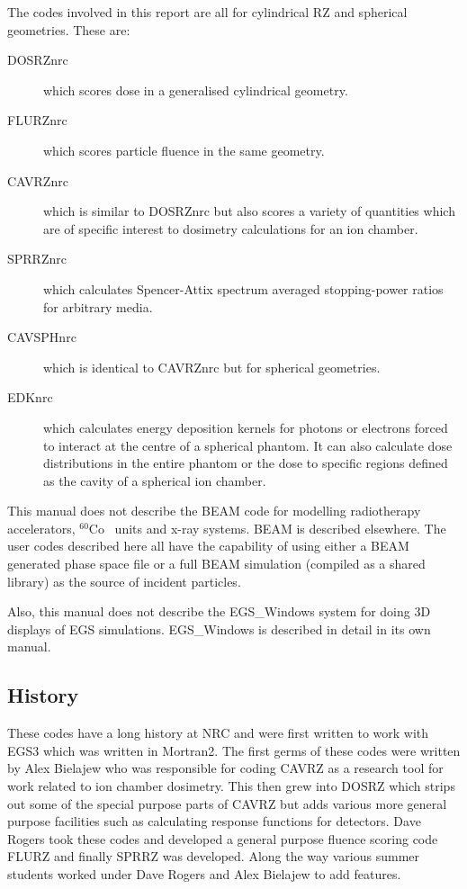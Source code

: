\documentclass[12pt,twoside]{article}  %
\newcommand{\Co}{$^{60}$Co}
\begin{document}
The codes involved in this report are all for
cylindrical RZ and spherical geometries. These are:
\begin{description}

\item[DOSRZnrc] which scores dose in a generalised cylindrical geometry.

\item[FLURZnrc] which scores particle fluence in the same geometry.

\item[CAVRZnrc] which is similar to DOSRZnrc but also scores a variety of
quantities which are of specific interest to dosimetry
calculations for an ion chamber.

\item[SPRRZnrc] which calculates Spencer-Attix spectrum averaged
stopping-power ratios for arbitrary media.

\item[CAVSPHnrc] which is identical to CAVRZnrc but for spherical
geometries.

\item[EDKnrc] which calculates energy deposition kernels for photons
or electrons forced to interact at the centre of a spherical phantom.
It can also calculate dose distributions in the entire phantom or the
dose to specific regions defined as the cavity of a spherical ion chamber.

\end{description}

This manual does not describe the BEAM code for modelling radiotherapy
accelerators, \Co~ units and x-ray systems. BEAM is described
elsewhere\cite{Ro95,Ro98a}. The user codes
described here all have the capability of using either a BEAM generated phase
space file or a full BEAM simulation (compiled as a shared library)
as the source of incident particles.

Also, this manual does not describe the EGS\_Windows system for doing 3D
displays of EGS simulations. EGS\_Windows is described in detail in its own
manual\cite{TR99a}.

\subsection{History}
These codes have a long history at NRC and were first written to work
with EGS3 which was written in Mortran2.  The first germs of these
codes were written by Alex Bielajew who was responsible for coding
CAVRZ as a research tool for work related to ion chamber dosimetry.
This then grew into DOSRZ which strips out some of the special purpose
parts of CAVRZ but adds various more general purpose facilities such as
calculating response functions for detectors. Dave Rogers took these
codes and developed a general purpose fluence scoring code FLURZ and
finally SPRRZ was developed.  Along the way various summer students worked
under Dave Rogers and Alex Bielajew to add features.
\end{document}
